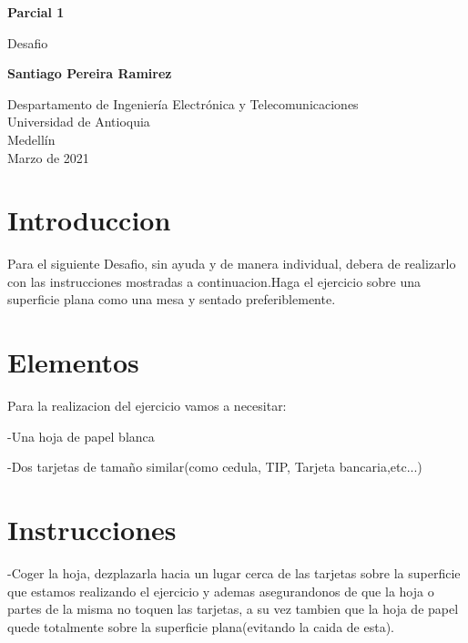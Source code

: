 \documentclass{article}
\begin{document}
\begin{titlepage}
    \begin{center}
        \vspace*{1cm}
            
        \Huge
        \textbf{Parcial 1 }
            
        \vspace{0.5cm}
        \LARGE
        Desafio
            
        \vspace{1.5cm}
            
        \textbf{Santiago Pereira Ramirez}
            
        \vfill
            
        \vspace{0.8cm}
            
        \Large
        Despartamento de Ingeniería Electrónica y Telecomunicaciones\\
        Universidad de Antioquia\\
        Medellín\\
        Marzo de 2021
            
    \end{center}
\end{titlepage}

\tableofcontents
\newpage
\section{Introduccion }\label{intro}
Para el siguiente Desafio, sin ayuda y de manera individual, debera de realizarlo con las instrucciones mostradas a continuacion.Haga el ejercicio sobre una superficie plana como una mesa y sentado preferiblemente.

\section{Elementos} \label{contenido}
Para la realizacion del ejercicio vamos a necesitar:

    -Una hoja de papel blanca
    
    -Dos tarjetas de tamaño similar(como cedula, TIP, Tarjeta bancaria,etc...)

\section{Instrucciones} \label{contenido}
    
    -Coger la hoja, dezplazarla hacia un lugar cerca de las tarjetas sobre la superficie que estamos realizando el ejercicio y ademas asegurandonos de que la hoja o partes de la misma no toquen las tarjetas, a su vez tambien que la hoja de papel quede totalmente sobre la superficie plana(evitando la caida de esta).
    
\end{document}
